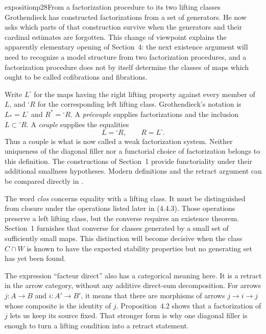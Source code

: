 \begin{dcomment}{exposition}{p28}{From a factorization procedure to its two lifting classes}
Grothendieck has constructed factorizations from a set of generators. He now asks which parts of that construction survive when the generators and their cardinal estimates are forgotten. This change of viewpoint explains the apparently elementary opening of Section~4: the next existence argument will need to recognize a model structure from two factorization procedures, and a factorization procedure does not by itself determine the classes of maps which ought to be called cofibrations and fibrations.

Write $L^{\square}$ for the maps having the right lifting property against every member of $L$, and ${}^{\square}R$ for the corresponding left lifting class. Grothendieck's notation is $L_*=L^{\square}$ and $R^*={}^{\square}R$. A \emph{pr\'ecouple} supplies factorizations and the inclusion $L\subset{}^{\square}R$. A \emph{couple} supplies the equalities
\[
 L={}^{\square}R,\qquad R=L^{\square}.
\]
Thus a couple is what is now called a weak factorization system. Neither uniqueness of the diagonal filler nor a functorial choice of factorization belongs to this definition. The constructions of Section~1 provide functoriality under their additional smallness hypotheses. Modern definitions and the retract argument can be compared directly in \citet[Definition~11.2.1 and Lemma~11.2.3]{Riehl2014}.

The word \emph{clos} concerns equality with a lifting class. It must be distinguished from closure under the operations listed later in (4.4.3). Those operations preserve a left lifting class, but the converse requires an existence theorem. Section~1 furnishes that converse for classes generated by a small set of sufficiently small maps. This distinction will become decisive when the class $C\cap W$ is known to have the expected stability properties but no generating set has yet been found.

The expression ``facteur direct'' also has a categorical meaning here. It is a retract in the arrow category, without any additive direct-sum decomposition. For arrows $j:A\to B$ and $i:A'\to B'$, it means that there are morphisms of arrows $j\to i\to j$ whose composite is the identity of $j$. Proposition~4.2 shows that a factorization of $j$ lets us keep its source fixed. That stronger form is why one diagonal filler is enough to turn a lifting condition into a retract statement.
\end{dcomment}

